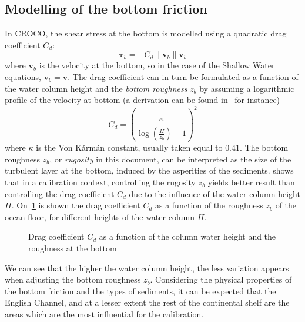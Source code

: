 \documentclass[../../Main_ManuscritThese.tex]{subfiles}
\newcommand{\CROCO}{CROCO}
\newcommand{\zob}{z_b}
\newcommand\imgpath{/home/victor/acadwriting/Manuscrit/Text/Chapter5/img/}
\begin{document}
\subsection{Modelling of the bottom friction}
\label{ssec:modelling_bottom}
In \CROCO, the shear stress at the bottom is modelled using a quadratic drag
coefficient $C_d$:
\begin{equation}
  \label{eq:bottom_stress_tau}
  \bm{\tau}_b= -C_d \|\mathbf{v}_b\|\mathbf{v}_b 
\end{equation}
where $\mathbf{v}_b$ is the velocity at the bottom, so in the case of
the Shallow Water equations, $\mathbf{v}_b = \mathbf{v}$.  The drag
coefficient can in turn be formulated as a function of the water
column height and the \emph{bottom roughness} $\zob$ by assuming a
logarithmic profile of the velocity at bottom (a derivation can be
found in~\cite{le_bars_amandes_2010} for instance)
\begin{equation}
  \label{eq:quadratic_friction_vonkarman}
  C_d = \left(\frac{\kappa}{\log\left(\frac{H}{\zob}\right) - 1}\right)^2%
\end{equation}
where $\kappa$ is the Von K\'arm\'an constant, usually taken equal to
$0.41$.  The bottom roughness $\zob$, or \emph{rugosity} in this
document, can be interpreted as the size of the turbulent layer at the
bottom, induced by the asperities of the sediments.
\cite{boutet_estimation_2015} shows that in a calibration context,
controlling the rugosity $\zob$ yields better result than controlling
the drag coefficient $C_d$ due to the influence of the water column
height $H$.
On~\cref{fig:cd_zob} is shown the drag coefficient $C_d$ as a function
of the roughness $\zob$ of the ocean floor, for different heights of
the water column $H$.
\begin{figure}[ht]
  \centering 
  \caption[Drag coefficient $C_d$ as a function of the height and the
  roughness]{\label{fig:cd_zob} Drag coefficient $C_d$ as a function
    of the column water height and the roughness at the bottom}
\end{figure}


We can see that the higher the water column height, the less variation
appears when adjusting the bottom roughness $\zob$.  Considering the
physical properties of the bottom friction and the types of sediments,
it can be expected that the English Channel, and at a lesser extent
the rest of the continental shelf are the areas which are the most
influential for the calibration.
\end{document}

